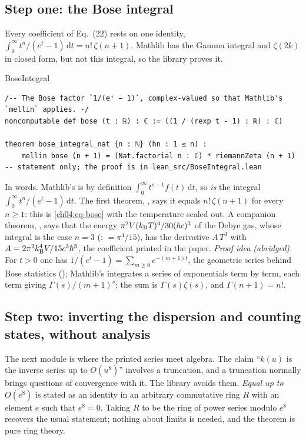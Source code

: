 \subsection{Step one: the Bose integral}
Every coefficient of Eq.~(22) rests on one identity, $\int_0^\infty t^n/(e^t-1)\,\mathrm dt=n!\,\zeta(n+1)$.
Mathlib has the Gamma integral and $\zeta(2k)$ in closed form, but not this integral, so the library proves it.

\begin{leanbox}{BoseIntegral}
\begin{lstlisting}[style=lean,basicstyle=\ttfamily\footnotesize]
/-- The Bose factor `1/(eᵗ − 1)`, complex-valued so that Mathlib's `mellin` applies. -/
noncomputable def bose (t : ℝ) : ℂ := ((1 / (rexp t - 1) : ℝ) : ℂ)

theorem bose_integral_nat {n : ℕ} (hn : 1 ≤ n) :
    mellin bose (n + 1) = (Nat.factorial n : ℂ) * riemannZeta (n + 1)
-- statement only; the proof is in lean_src/BoseIntegral.lean
\end{lstlisting}
\end{leanbox}

\noindent In words.
Mathlib's  is by definition $\int_0^\infty t^{s-1}f(t)\,\mathrm dt$, so  \emph{is} the integral $\int_0^\infty t^n/(e^t-1)\,\mathrm dt$.
The first theorem, , says it equals $n!\,\zeta(n+1)$ for every $n\ge1$: this is \eqref{ch04:eq-bose} with the temperature scaled out.
A companion theorem, , says that the energy $\pi^2V(k_{\mathrm B} T)^4/30(\hbar c)^3$ of the Debye gas, whose integral is the case $n=3$ (:  $=\pi^4/15$), has the derivative $A\,T^3$ with $A=2\pi^2k_{\mathrm B}^4V/15c^3\hbar^3$, the coefficient printed in the paper.
\emph{Proof idea (abridged).} For $t>0$ one has $1/(e^t-1)=\sum_{m\ge0}e^{-(m+1)t}$, the geometric series behind Bose statistics (); Mathlib's  integrates a series of exponentials term by term, each term giving $\Gamma(s)/(m+1)^s$; the sum is $\Gamma(s)\zeta(s)$, and $\Gamma(n+1)=n!$.

\subsection{Step two: inverting the dispersion and counting states, without analysis}
The next module is where the printed series meet algebra.
The claim ``$k(u)$ is the inverse series up to $O(u^8)$'' involves a truncation, and a truncation normally brings questions of convergence with it.
The library avoids them.
\emph{Equal up to $O(e^8)$} is stated as an identity in an arbitrary commutative ring $R$ with an element $e$ such that $e^8=0$.
Taking $R$ to be the ring of power series modulo $e^8$ recovers the usual statement; nothing about limits is needed, and the theorem is pure ring theory.

